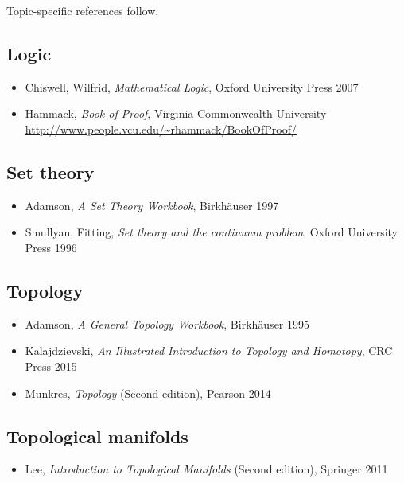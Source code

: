 \noindent Topic-specific references follow.

\subsection*{Logic}

\begin{itemize}
\item Chiswell, Wilfrid, \textit{Mathematical Logic}, Oxford University Press 2007
\item Hammack, \textit{Book of Proof}, Virginia Commonwealth University\\
\url{http://www.people.vcu.edu/~rhammack/BookOfProof/}
\end{itemize}

\subsection*{Set theory}

\begin{itemize}
\item Adamson, \textit{A Set Theory Workbook}, Birkh\"auser 1997
\item Smullyan, Fitting, \textit{Set theory and the continuum problem}, Oxford University Press 1996
\end{itemize}

\subsection*{Topology}

\begin{itemize}
\item Adamson, \textit{A General Topology Workbook}, Birkh\"auser 1995
\item Kalajdzievski, \textit{An Illustrated Introduction to Topology and Homotopy}, CRC Press 2015
\item Munkres, \textit{Topology} (Second edition), Pearson 2014
\end{itemize}

\subsection*{Topological manifolds}

\begin{itemize}
\item Lee, \textit{Introduction to Topological Manifolds} (Second edition), Springer 2011
\end{itemize}

